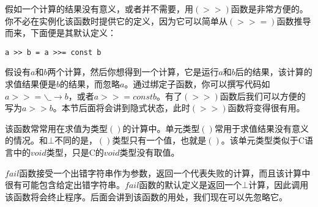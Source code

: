 假如一个计算的结果没有意义，或者并不需要，用$(>>)$函数是非常方便的。你不必在实例化该函数时提供它的定义，因为它可以简单从$(>>=)$函数推导而来，下面便是其默认定义：

\begin{lstlisting}
a >> b = a >>= const b
\end{lstlisting}

假设有$a$和$b$两个计算，然后你想得到一个计算，它是运行$a$和$b$后的结果，该计算的求值结果便是$b$的结果，而忽略$a$。通过绑定子函数，你可以撰写代码如$a >>= \backslash\_ \rightarrow b$，或者$ a >>= const b$。有了$(>>)$函数后我们可以方便的写为$a >> b$。本节后面将会讲到隐式状态，此时$(>>)$函数将变得很有用。

该函数常常用在求值为类型$()$的计算中。单元类型$()$常用于求值结果没有意义的情况。和$\bot$不同的是，$()$类型只有一个值，也就是$()$。该单元类型类似于C语言中的$void$类型，只是C的$void$类型没有取值。

$fail$函数接受一个出错字符串作为参数，返回一个代表失败的计算，而且该计算中很有可能包含给定出错字符串。$fail$函数的默认定义是返回一个$\bot$计算，因此调用该函数将会终止程序。后面会讲到该函数的用处，我们现在可以先忽略它。
